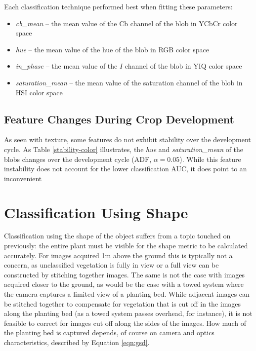 \documentclass[letterpaper]{report}
\begin{document}
Each classification technique performed best when fitting these parameters:
\begin{itemize}
	\item{\textit{cb\_mean} -- the mean value of the Cb channel of the blob in YCbCr color space}
	\item{\textit{hue} -- the mean value of the hue of the blob in RGB color space}
	\item{\textit{in\_phase} -- the mean value of the $I$ channel of the blob in YIQ color space}
	\item{\textit{saturation\_mean} -- the mean value of the saturation channel of the blob in HSI color space}
\end{itemize}

\subsection{Feature Changes During Crop Development}
As seen with texture, some features do not exhibit stability over the development cycle. As Table \ref{stability-color} illustrates, the \textit{hue} and \textit{saturation\_mean} of the blobs changes over the development cycle (ADF, $\alpha = 0.05$). While this feature instability does not account for the lower classification AUC, it does point to an inconvenient

{
\renewcommand{\arraystretch}{1.2}

}


\section{Classification Using Shape}
Classification using the shape of the object suffers from a topic touched on previously: the entire plant must be visible for the shape metric to be calculated accurately. For images acquired 1m above the ground this is typically not a concern, as unclassified vegetation is fully in view or a full view can be constructed by stitching together images. The same is not the case with images acquired closer to the ground, as would be the case with a towed system where the camera captures a limited view of a planting bed. While adjacent images can be stitched together to compensate for vegetation that is cut off in the images along the planting bed (as a towed system passes overhead, for instance), it is not feasible to correct for images cut off along the sides of the images. How much of the planting bed is captured depends, of course on camera and 
optics characteristics, described by Equation \ref{eqn:gsd}.
\end{document}
